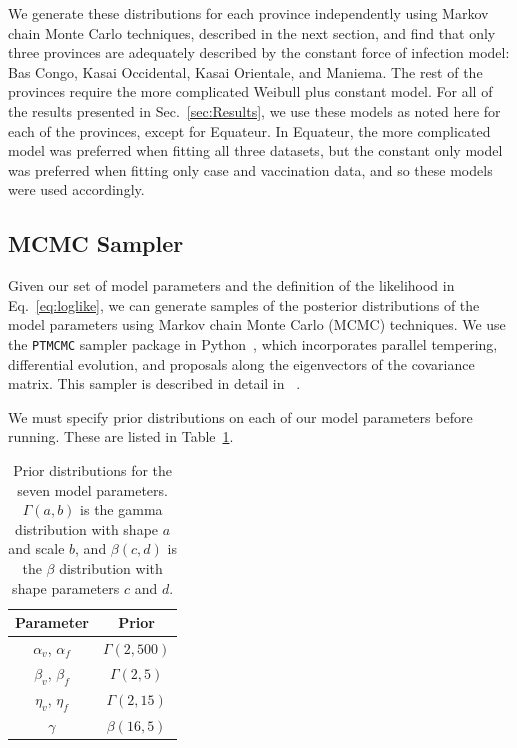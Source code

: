 \documentclass[nofootinbib,aps,pre,twocolumn,superscriptaddress,showkeys,showpacs]{revtex4-1}
\begin{document}
We generate these distributions for each province independently using Markov chain Monte Carlo techniques, described in the next section, and find that only three provinces are adequately described by the constant force of infection model:  Bas Congo, Kasai Occidental, Kasai Orientale, and Maniema. The rest of the provinces require the more complicated Weibull plus constant model. For all of the results presented in Sec.~\ref{sec:Results}, we use these models as noted here for each of the provinces, except for Equateur. In Equateur, the more complicated model was preferred when fitting all three datasets, but the constant only model was preferred when fitting only case and vaccination data, and so these models were used accordingly.

\subsection{MCMC Sampler \label{subsec:MCMC}}
Given our set of model parameters and the definition of the likelihood in Eq.~\ref{eq:loglike}, we can generate samples of the posterior distributions of the model parameters using Markov chain Monte Carlo (MCMC) techniques. We use the \texttt{PTMCMC} sampler package in Python~\cite{PTMCMC}, which incorporates parallel tempering, differential evolution, and proposals along the eigenvectors of the covariance matrix. This sampler is described in detail in ~\cite{Arzoumanian2014}.

We must specify prior distributions on each of our model parameters before running. These are listed in Table~\ref{table:priors}. 
\begin{table}
\begin{center}
\begin{tabular}{ c|c }  
Parameter & Prior \\
 \hline
 $\alpha_v$, $\alpha_f$ & $\Gamma(2,500)$ \\ 
 $\beta_v$, $\beta_f$ &$ \Gamma(2,5)$ \\ 
 $\eta_v$, $\eta_f$&$ \Gamma(2,15)$ \\ 
 $\gamma$ & $\beta(16,5)$ \\
 \hline
\end{tabular}
\caption{Prior distributions for the seven model parameters. $\Gamma(a,b)$ is the gamma distribution with shape $a$ and scale $b$, and $\beta(c,d)$ is the $\beta$ distribution with shape parameters $c$ and $d$. \label{table:priors}}
\end{center}
\end{table}
\end{document}
